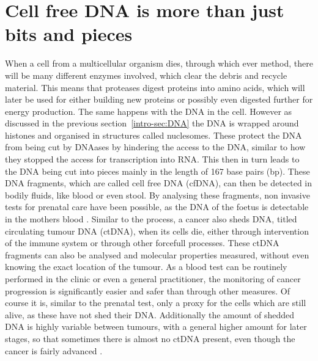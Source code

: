 \section[cfDNA]{Cell free DNA is more than just bits and pieces}
\label{intro-sec:ctDNA}

When a cell from a multicellular organism dies, through which ever method, there will be many different enzymes involved, which clear the debris and recycle material. This means that proteases digest proteins into amino acids, which will later be used for either building new proteins or possibly even digested further for energy production. The same happens with the DNA in the cell. However as discussed in the previous section~\ref{intro-sec:DNA} the DNA is wrapped around histones and organised in structures called nuclesomes. These protect the DNA from being cut by DNAases by hindering the access to the DNA, similar to how they stopped the access for transcription into RNA. This then in turn leads to the DNA being cut into pieces mainly in the length of 167 base pairs (bp). 
These DNA fragments, which are called cell free DNA (cfDNA), can then be detected in bodily fluids, like blood or even stool. By analysing these fragments, non invasive tests for prenatal care have been possible, as the DNA of the foetus is detectable in the mothers blood \cite{Dan2012,Nicolaides2013}.
Similar to the process, a cancer also sheds DNA, titled circulating tumour DNA (ctDNA), when its cells die, either through intervention of the immune system or through other forcefull processes. These ctDNA fragments can also be analysed and molecular properties measured, without even knowing the exact location of the tumour. As a blood test can be routinely performed in the clinic or even a general practitioner, the monitoring of cancer progression is significantly easier and safer than through other measures. Of course it is, similar to the prenatal test, only a proxy for the cells which are still alive, as these have not shed their DNA. Additionally the amount of shedded DNA is highly variable between tumours, with a general higher amount for later stages, so that sometimes there is almost no ctDNA present, even though the cancer is fairly advanced \cite{Diehl2008,Schwarzenbach2011}.